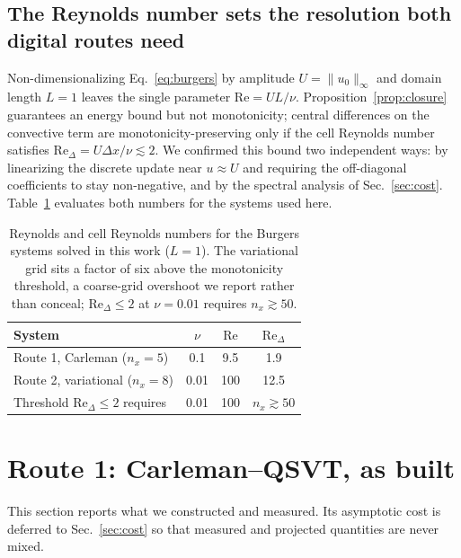 \documentclass[aps,prx,twocolumn,notitlepage,superscriptaddress,floatfix,10pt]{revtex4-2}
\newcommand{\norm}[1]{\lVert #1 \rVert}
\newcommand{\Rey}{\mathrm{Re}}
\begin{document}
\subsection{The Reynolds number sets the resolution both digital routes need}
\label{sec:reynolds}

Non-dimensionalizing Eq.~\eqref{eq:burgers} by amplitude $U=\norm{u_0}_\infty$ and domain length
$L=1$ leaves the single parameter $\Rey=UL/\nu$. Proposition~\ref{prop:closure} guarantees an energy
bound but not monotonicity; central differences on the convective term are monotonicity-preserving
only if the cell Reynolds number satisfies $\Rey_\Delta=U\Delta x/\nu\lesssim2$. We confirmed this
bound two independent ways: by linearizing the discrete update near $u\approx U$ and requiring the
off-diagonal coefficients to stay non-negative, and by the spectral analysis of
Sec.~\ref{sec:cost}. Table~\ref{tab:reynolds} evaluates both numbers for the systems used here.

\begin{table}[t]
\caption{Reynolds and cell Reynolds numbers for the Burgers systems solved in this work ($L=1$).
The variational grid sits a factor of six above the monotonicity threshold, a coarse-grid overshoot
we report rather than conceal; $\Rey_\Delta\le2$ at $\nu=0.01$ requires $n_x\gtrsim50$.}
\label{tab:reynolds}
\begin{ruledtabular}
\begin{tabular}{lccc}
System & $\nu$ & $\Rey$ & $\Rey_\Delta$ \\
\hline
Route 1, Carleman ($n_x=5$) & 0.1 & 9.5 & 1.9 \\
Route 2, variational ($n_x=8$) & 0.01 & 100 & 12.5 \\
Threshold $\Rey_\Delta\le2$ requires & 0.01 & 100 & $n_x\gtrsim50$ \\
\end{tabular}
\end{ruledtabular}
\end{table}

\section{Route 1: Carleman--QSVT, as built}
\label{sec:carleman}

This section reports what we constructed and measured. Its asymptotic cost is deferred to
Sec.~\ref{sec:cost} so that measured and projected quantities are never mixed.
\end{document}
